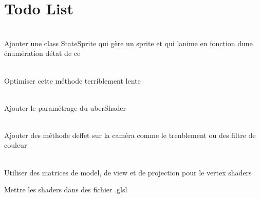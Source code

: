 \chapter{Todo List}
\hypertarget{todo}{}\label{todo}

\begin{DoxyRefList}
\item[Class \doxylink{classAnimatedSprite}{Animated\+Sprite} ]\hfill \\
\label{todo__todo000001}%
%
Ajouter une class State\+Sprite qui gère un sprite et qui l\textquotesingle{}anime en fonction d\textquotesingle{}une énumération d\textquotesingle{}état de ce   
\item[Member \doxylink{bbopFunc_8cpp_adb58533b6c571ff05497756cc224b28a}{bbop\+Debug\+Collision\+Box} (const \doxylink{classCollisionBox}{Collision\+Box} \&box, \doxylink{classScene}{Scene} \&scene)]\hfill \\
\label{todo__todo000003}%
%
Optimiser cette méthode terriblement lente  
\item[Member \doxylink{bbopFunc_8cpp_a697650ee78695079a1f5549465584e43}{bbop\+Init} (int windowX, int windowY, const char \texorpdfstring{$\ast$}{*}window\+Name, GLFWwindow \texorpdfstring{$\ast$}{*}\&window)]\hfill \\
\label{todo__todo000002}%
%
Ajouter le paramétrage du uber\+Shader  
\item[Class \doxylink{classCamera}{Camera} ]\hfill \\
\label{todo__todo000005}%
%
Ajouter des méthode d\textquotesingle{}effet sur la caméra comme le trenblement ou des filtre de couleur  
\item[Member \doxylink{shaders_8cpp_aa4e3821fb3d25cef0fcd8bd89a1666e8}{default\+Fragment} ]\hfill \\
\label{todo__todo000010}%
%
Utiliser des matrices de model, de view et de projection pour le vertex shaders 



Mettre les shaders dans des fichier .glsl 




\end{DoxyRefList}
